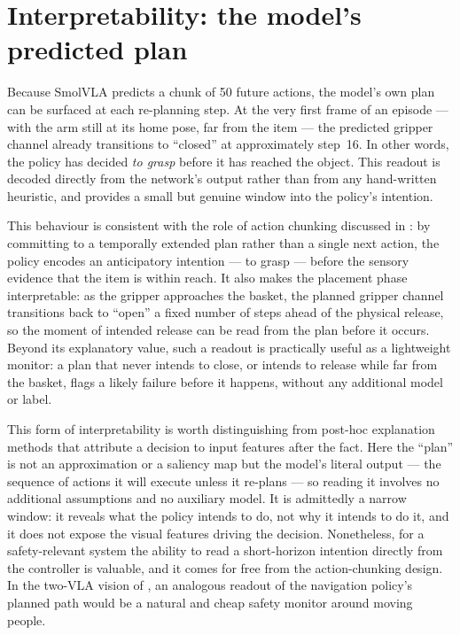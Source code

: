 \section{Interpretability: the model's predicted plan}
\label{sec:results-interpret}
Because SmolVLA predicts a chunk of 50 future actions, the model's own plan can be
surfaced at each re-planning step. At the very first frame of an episode --- with
the arm still at its home pose, far from the item --- the predicted gripper channel
already transitions to ``closed'' at approximately step~16. In other words, the
policy has decided \emph{to grasp} before it has reached the object. This readout
is decoded directly from the network's output rather than from any hand-written
heuristic, and provides a small but genuine window into the policy's intention.

This behaviour is consistent with the role of action chunking discussed in
: by committing to a temporally extended plan rather than a single
next action, the policy encodes an anticipatory intention --- to grasp --- before the
sensory evidence that the item is within reach. It also makes the placement phase
interpretable: as the gripper approaches the basket, the planned gripper channel
transitions back to ``open'' a fixed number of steps ahead of the physical release,
so the moment of intended release can be read from the plan before it occurs. Beyond
its explanatory value, such a readout is practically useful as a lightweight monitor:
a plan that never intends to close, or intends to release while far from the basket,
flags a likely failure before it happens, without any additional model or label.

This form of interpretability is worth distinguishing from post-hoc explanation
methods that attribute a decision to input features after the fact. Here the ``plan''
is not an approximation or a saliency map but the model's literal output --- the
sequence of actions it will execute unless it re-plans --- so reading it involves no
additional assumptions and no auxiliary model. It is admittedly a narrow window: it
reveals what the policy intends to do, not why it intends to do it, and it does not
expose the visual features driving the decision. Nonetheless, for a safety-relevant
system the ability to read a short-horizon intention directly from the controller is
valuable, and it comes for free from the action-chunking design. In the two-VLA vision
of , an analogous readout of the navigation policy's planned path
would be a natural and cheap safety monitor around moving people.

